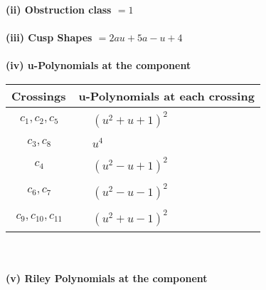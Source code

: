 \documentclass[1p]{elsarticle_modified}
\theoremstyle{definition}
\begin{document}
\flushleft \textbf{(ii) Obstruction class $= 1$}\\~\\
\flushleft \textbf{(iii) Cusp Shapes $= 2 a u+5 a- u+4$}\\~\\
\newpage\renewcommand{\arraystretch}{1}
\flushleft \textbf{(iv) u-Polynomials at the component}\newline \\
\begin{tabular}{m{50pt}|m{274pt}}
Crossings & \hspace{64pt}u-Polynomials at each crossing \\
\hline $$\begin{aligned}c_{1},c_{2},c_{5}\end{aligned}$$&$\begin{aligned}
&(u^2+u+1)^2
\end{aligned}$\\
\hline $$\begin{aligned}c_{3},c_{8}\end{aligned}$$&$\begin{aligned}
&u^4
\end{aligned}$\\
\hline $$\begin{aligned}c_{4}\end{aligned}$$&$\begin{aligned}
&(u^2- u+1)^2
\end{aligned}$\\
\hline $$\begin{aligned}c_{6},c_{7}\end{aligned}$$&$\begin{aligned}
&(u^2- u-1)^2
\end{aligned}$\\
\hline $$\begin{aligned}c_{9},c_{10},c_{11}\end{aligned}$$&$\begin{aligned}
&(u^2+u-1)^2
\end{aligned}$\\
\hline
\end{tabular}\\~\\
\newpage\renewcommand{\arraystretch}{1}
\flushleft \textbf{(v) Riley Polynomials at the component}\newline \\
\end{document}
